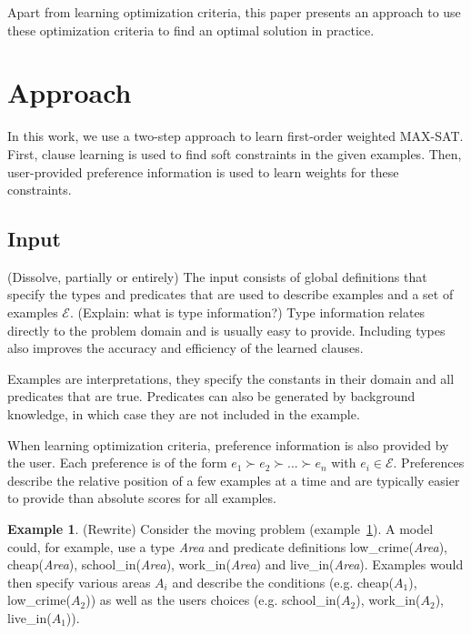 \documentclass[letterpaper]{article}
\newcommand{\sym}[1]{\ensuremath{\mathcal{#1}}}
\theoremstyle{definition}
\newtheorem{example}{Example}
\newcommand{\anton}[1]{{\color{green}(#1)}}
\newcommand{\sam}[1]{{\color{red}(#1)}}
\begin{document}
Apart from learning optimization criteria, this paper presents an approach to use these optimization criteria to find an optimal solution in practice.


\section{Approach}
In this work, we use a two-step approach to learn first-order weighted MAX-SAT.
First, clause learning is used to find soft constraints in the given examples.
Then, user-provided preference information is used to learn weights for these constraints.

\subsection{Input} \sam{Dissolve, partially or entirely}
The input consists of global definitions that specify the types and predicates that are used to describe examples and a set of examples \sym{E}.
\anton{Explain: what is type information?}
Type information relates directly to the problem domain and is usually easy to provide.
Including types also improves the accuracy and efficiency of the learned clauses.

Examples are interpretations, they specify the constants in their domain and all predicates that are true.
Predicates can also be generated by background knowledge, in which case they are not included in the example.

When learning optimization criteria, preference information is also provided by the user.
Each preference is of the form $e_1 \succ e_2 \succ ... \succ e_n$ with $e_i \in \sym{E}$.
Preferences describe the relative position of a few examples at a time and are typically easier to provide than absolute scores for all examples.

\begin{example} \sam{Rewrite}
  \label{ex:moving-input}
  Consider the moving problem (example~\ref{ex:moving-input}).
  A model could, for example, use a type \textit{Area} and predicate definitions low\_crime(\textit{Area}), cheap(\textit{Area}), school\_in(\textit{Area}), work\_in(\textit{Area}) and live\_in(\textit{Area}).
  Examples would then specify various areas $A_i$ and describe the conditions (e.g. cheap($A_1$), low\_crime($A_2$)) as well as the users choices (e.g. school\_in($A_2$), work\_in($A_2$), live\_in($A_1$)).
\end{example}
\end{document}
